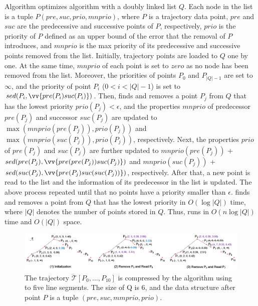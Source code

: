 Algorithm \squishe optimizes algorithm \tpa with a doubly linked list $Q$. Each node in the list is a tuple $P(pre, suc, prio, mnprio)$, where $P$ is a trajectory data point, $pre$ and $suc$ are the predecessive  and successive points of $P$, respectively,  $prio$ is the priority of $P$ defined as an upper bound of the \sed error that the removal of $P$ introduces, and $mnprio$ is the max priority of its predecessive and successive points removed from the list.
%
Initially, trajectory points are loaded to $Q$ one by one.
At the same time, $mnprio$ of each point is set to $zero$ as no node has been removed from the list.
Moreover, the priorities of points $P_0$ and $P_{|Q|-1}$ are set to $\infty$, and the priority of point $P_i$ ($0<i<|Q|-1$) is set to $sed(P_i, \vv{pre(P_{i})suc(P_{i})})$.
%
Then, \squishe finds and removes a point $P_j$ from $Q$ that has the lowest priority $prio(P_j)<\epsilon$, and the properties $mnprio$ of predecessor $pre(P_j)$ and successor $suc(P_j)$ are updated to $\max(mnprio(pre(P_j)), prio(P_j))$ and $\max(mnprio(suc(P_j)), prio(P_j))$, respectively.
Next, the properties $prio$ of $pre(P_j)$ and $suc(P_j)$ are further updated to $mnprio(pre(P_j))$ + $sed(pre(P_j), \vv{pre(pre(P_{j}))suc(P_{j})})$ and $mnprio(suc(P_j))$ + $sed(suc(P_j),\vv{pre(P_{j})suc(suc(P_{j}))})$, respectively.
%
After that, a new point is read to the list and the information of its predecessor in the list is updated.
%
The above process repeated until that no points have a priority smaller than $\epsilon$. 
%
\squishe finds and removes a point from $Q$ that has the lowest priority in $O(\log |Q|)$ time, where $|Q|$ denotes the number of points stored in $Q$.
Thus, \squishe runs in $O(n\log |Q|)$ time and $O(|Q|)$ space.



\begin{figure}[tb!]
	\centering
	\includegraphics[scale=0.48]{Figures/Fig-Squishe.png}
	\vspace{-2ex}
	\caption{\small The trajectory $\dddot{\mathcal{T}}[P_0, \ldots, P_{10}]$ is compressed by the \squishe algorithm using \sed to five line segments. The size of Q is 6, and the data structure after point $P$ is a tuple $(pre, suc, mmprio, prio)$. }
	\vspace{-1ex}
	\label{fig:squishe}
\end{figure}



